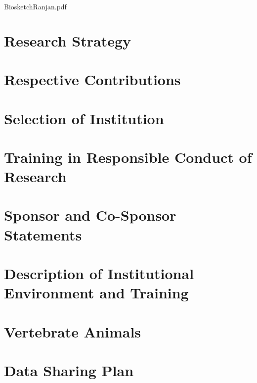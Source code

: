 \documentclass[11pt]{report}
\begin{document}

{BiosketchRanjan.pdf}
\newpage


\newpage


\newpage 

\section{Research Strategy}



\newpage

\section{Respective Contributions}

\newpage

\section{Selection of Institution}

\newpage

\section{Training in Responsible Conduct of Research}

\newpage

\section{Sponsor and Co-Sponsor Statements}

\newpage

\section{Description of Institutional Environment and Training} 

\newpage

\section{Vertebrate Animals}

\newpage

\section{Data Sharing Plan}

\newpage
\end{document}
